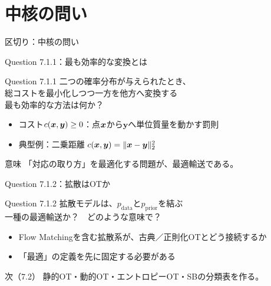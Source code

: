 \section{中核の問い}
\asmain
\begin{frame}{区切り：中核の問い}
    \tableofcontents[currentsection]
\end{frame}
\asmain
\begin{frame}{Question 7.1.1：最も効率的な変換とは}
    \begin{alertblock}{Question 7.1.1}
        二つの確率分布が与えられたとき、\\
        総コストを最小化しつつ一方を他方へ変換する\\
        最も効率的な方法は何か？
    \end{alertblock}
    \begin{itemize}
        \item コスト$c(\bm{x},\bm{y})\ge 0$：点$\bm{x}$から$\bm{y}$へ単位質量を動かす罰則
        \item 典型例：二乗距離 $c(\bm{x},\bm{y})=\|\bm{x}-\bm{y}\|_2^{2}$
    \end{itemize}
    \begin{exampleblock}{意味}
        「対応の取り方」を最適化する問題が、最適輸送である。
    \end{exampleblock}
\end{frame}
\asmain
\begin{frame}{Question 7.1.2：拡散はOTか}
    \begin{alertblock}{Question 7.1.2}
        拡散モデルは、$p_{\mathrm{data}}$と$p_{\mathrm{prior}}$を結ぶ\\
        一種の最適輸送か？　どのような意味で？
    \end{alertblock}
    \begin{itemize}
        \item Flow Matchingを含む拡散系が、古典／正則化OTとどう接続するか
        \item 「最適」の定義を先に固定する必要がある
    \end{itemize}
    \begin{block}{次（7.2）}
        静的OT・動的OT・エントロピーOT・SBの分類表を作る。
    \end{block}
\end{frame}
